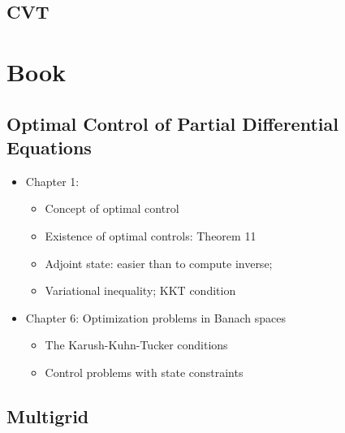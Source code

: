 \documentclass{article}
\begin{document}
\subsection{CVT}



\section{Book}
\subsection{ Optimal Control of Partial Differential Equations  \cite{FT1}}
\begin{itemize}
\item Chapter 1:
\begin{itemize}
\item Concept of optimal control
\item Existence of optimal controls: Theorem 11
\item Adjoint state: easier than to compute inverse;
\item Variational inequality; KKT condition
\end{itemize}
\item Chapter 6: Optimization problems in Banach spaces
\begin{itemize}
\item The Karush-Kuhn-Tucker conditions
\item Control problems with state constraints
\end{itemize}
\end{itemize}

\subsection {Multigrid \cite{trotten}}



 

\end{document}
